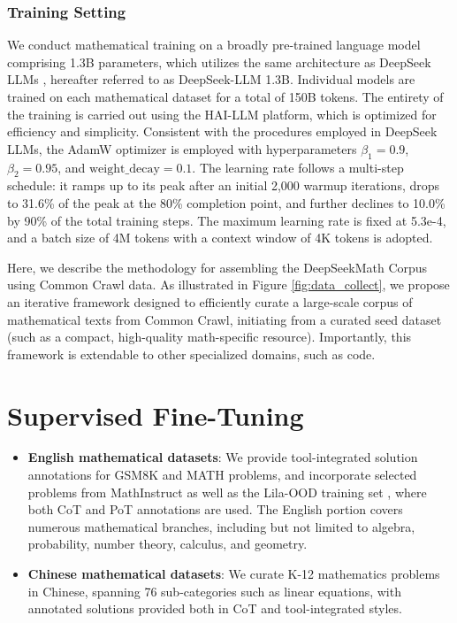 \begin{itemize}[topsep=0pt]
\subsubsection{Training Setting}
\label{sec:quality-policy}
We conduct mathematical training on a broadly pre-trained language model comprising 1.3B parameters, which utilizes the same architecture as DeepSeek LLMs \citep{deepseek-llm}, hereafter referred to as DeepSeek-LLM 1.3B. Individual models are trained on each mathematical dataset for a total of 150B tokens. The entirety of the training is carried out using the HAI-LLM \citep{haillm} platform, which is optimized for efficiency and simplicity. Consistent with the procedures employed in DeepSeek LLMs, the AdamW optimizer \citep{adamW} is employed with hyperparameters $\beta_1=0.9$, $\beta_2=0.95$, and $\mathrm{weight\_decay}=0.1$. The learning rate follows a multi-step schedule: it ramps up to its peak after an initial 2,000 warmup iterations, drops to 31.6\% of the peak at the 80\% completion point, and further declines to 10.0\% by 90\% of the total training steps. The maximum learning rate is fixed at 5.3e-4, and a batch size of 4M tokens with a context window of 4K tokens is adopted.

Here, we describe the methodology for assembling the DeepSeekMath Corpus using Common Crawl data. As illustrated in Figure \ref{fig:data_collect}, we propose an iterative framework designed to efficiently curate a large-scale corpus of mathematical texts from Common Crawl, initiating from a curated seed dataset (such as a compact, high-quality math-specific resource). Importantly, this framework is extendable to other specialized domains, such as code.

\section{Supervised Fine-Tuning}

\begin{itemize}[topsep=0pt]
    \item \textbf{English mathematical datasets}: We provide tool-integrated solution annotations for GSM8K and MATH problems, and incorporate selected problems from MathInstruct \citep{MathInstruct} as well as the Lila-OOD training set \citep{lila}, where both CoT and PoT annotations are used. The English portion covers numerous mathematical branches, including but not limited to algebra, probability, number theory, calculus, and geometry.
    \item \textbf{Chinese mathematical datasets}: We curate K-12 mathematics problems in Chinese, spanning 76 sub-categories such as linear equations, with annotated solutions provided both in CoT and tool-integrated styles.
\end{itemize}


\end{itemize}
